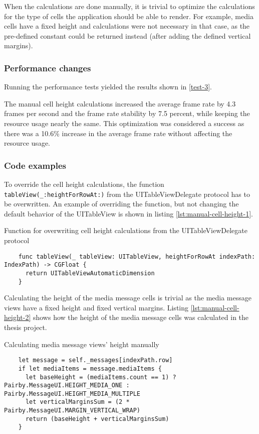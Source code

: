 \documentclass[a4paper,12pt]{article}
\begin{document}
When the calculations are done manually, it is trivial to optimize the calculations for the type of cells the application should be able to render. For example, media cells have a fixed height and calculations were not necessary in that case, as the pre-defined constant could be returned instead (after adding the defined vertical margins).

\subsubsection{Performance changes}
Running the performance tests yielded the results shown in \autoref{test-3}.

The manual cell height calculations increased the average frame rate by 4.3 frames per second and the frame rate stability by 7.5 percent, while keeping the resource usage nearly the same. This optimization was considered a success as there was a 10.6\% increase in the average frame rate without affecting the resource usage. 

\subsubsection{Code examples}
To override the cell height calculations, the function \texttt{tableView(_:heightForRowAt:)} from the UITableViewDelegate protocol has to be overwritten. An example of overriding the function, but not changing the default behavior of the UITableView is shown in listing \autoref{lst:manual-cell-height-1}.
\begin{listing}[H]
  \caption{Function for overwriting cell height calculations from the UITableViewDelegate protocol}
  \label{lst:manual-cell-height-1}
  \begin{verbatim}
    func tableView(_ tableView: UITableView, heightForRowAt indexPath: IndexPath) -> CGFloat {
      return UITableViewAutomaticDimension
    }
  \end{verbatim}
\end{listing}

Calculating the height of the media message cells is trivial as the media message views have a fixed height and fixed vertical margins. Listing \autoref{lst:manual-cell-height-2} shows how the height of the media message cells was calculated in the thesis project.
\begin{listing}[H]
  \caption{Calculating media message views' height manually}
  \label{lst:manual-cell-height-2}
  \begin{verbatim}
    let message = self._messages[indexPath.row]
    if let mediaItems = message.mediaItems {
      let baseHeight = (mediaItems.count == 1) ? Pairby.MessageUI.HEIGHT_MEDIA_ONE : Pairby.MessageUI.HEIGHT_MEDIA_MULTIPLE
      let verticalMarginsSum = (2 * Pairby.MessageUI.MARGIN_VERTICAL_WRAP)
      return (baseHeight + verticalMarginsSum)
    }
  \end{verbatim}
\end{listing}
\end{document}
